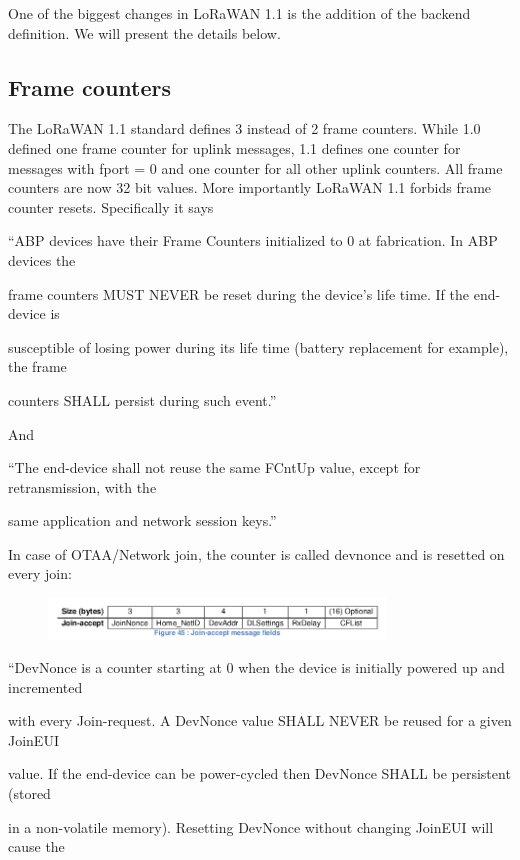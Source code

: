 {One of the biggest changes in LoRaWAN 1.1 is the addition of the
backend definition. We will present the details below.

\hypertarget{h.jpbc1i7c9eqd}{\subsection{\texorpdfstring{{Frame
counters}}{Frame counters}}\label{h.jpbc1i7c9eqd}}

{The LoRaWAN 1.1 standard defines 3 instead of 2 frame counters. While
1.0 defined one frame counter for uplink messages, 1.1 defines one
counter for messages with fport = 0 and one counter for all other uplink
counters. All frame counters are now 32 bit values. More importantly
}{LoRaWAN 1.1 forbids frame counter resets}{. Specifically it says}

{``ABP devices have their Frame Counters initialized to 0 at
fabrication. In ABP devices the}

{frame counters MUST NEVER be reset during the device's life time. If
the end-device is}

{susceptible of losing power during its life time (battery replacement
for example), the frame}

{counters SHALL persist during such event.''}

{And}

{``The end-device shall not reuse the same FCntUp value, except for
retransmission, with the}

{same application and network session keys.''}

{In case of OTAA/Network join, the counter is called devnonce and is
resetted on every join:}

\begin{figure}[h!]
{\includegraphics[width=0.8\textwidth]{images/image14.png}}
\end{figure}

{``DevNonce is a counter starting at 0 when the device is initially
powered up and incremented}

{with every Join-request. A DevNonce value SHALL NEVER be reused for a
given JoinEUI}

{value. If the end-device can be power-cycled then DevNonce SHALL be
persistent (stored}

{in a non-volatile memory). Resetting DevNonce without changing JoinEUI
will cause the}

}
